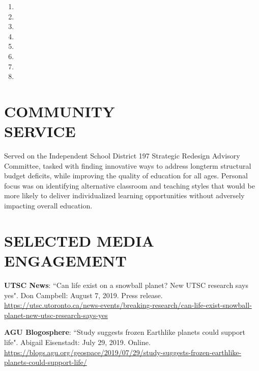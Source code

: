 \documentclass[10pt]{res} %
\begin{document}
\begin{resume}
\begin{enumerate}
\item {}
\item {}
\item {}
\item {}
\item {}
\item {}
\item {}
\item {}
\end{enumerate}


% 
\section{COMMUNITY \\ SERVICE}

Served on the Independent School District 197 Strategic Redesign Advisory Committee, tasked with finding innovative ways to address longterm structural budget deficits, while improving the quality of education for all ages. Personal focus was on identifying alternative classroom and teaching styles that would be more likely to deliver individualized learning opportunities without adversely impacting
overall education.


\section{SELECTED MEDIA ENGAGEMENT}

\textbf{UTSC News}: ``Can life exist on a snowball planet? New UTSC research says yes". Don Campbell: August 7, 2019. Press release. \url{https://utsc.utoronto.ca/news-events/breaking-research/can-life-exist-snowball-planet-new-utsc-research-says-yes}

\textbf{AGU Blogosphere}: ``Study suggests frozen Earthlike planets could support life". Abigail Eisenstadt: July 29, 2019. Online. \url{https://blogs.agu.org/geospace/2019/07/29/study-suggests-frozen-earthlike-planets-could-support-life/}


\end{resume}
\end{document}
